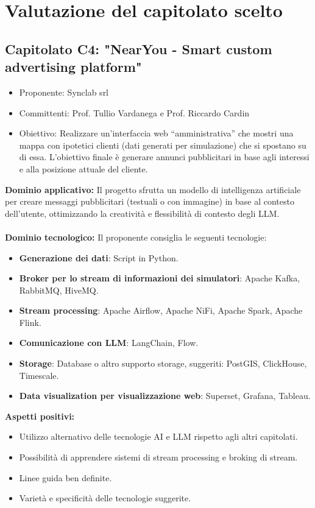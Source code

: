 \documentclass[10pt]{article}
\begin{document}
\section{Valutazione del capitolato scelto}
\subsection{Capitolato C4: "NearYou - Smart custom advertising platform"}
\begin{itemize}
    \item Proponente: Synclab srl
    \item Committenti: Prof. Tullio Vardanega e Prof. Riccardo Cardin
    \item Obiettivo: Realizzare un'interfaccia web “amministrativa” che mostri una mappa con ipotetici clienti (dati generati per simulazione) che si spostano su di essa. L’obiettivo finale è generare annunci pubblicitari in base agli interessi e alla posizione attuale del cliente.
\end{itemize}
\textbf{Dominio applicativo:}
Il progetto sfrutta un modello di intelligenza artificiale per creare messaggi pubblicitari (testuali o con immagine) in base al contesto dell’utente, ottimizzando la creatività e flessibilità di contesto degli LLM.\\
\\
\textbf{Dominio tecnologico:}  
Il proponente consiglia le seguenti tecnologie:
\begin{itemize}
    \item \textbf{Generazione dei dati}: Script in Python.
    \item \textbf{Broker per lo stream di informazioni dei simulatori}: Apache Kafka, RabbitMQ, HiveMQ.
    \item \textbf{Stream processing}: Apache Airflow, Apache NiFi, Apache Spark, Apache Flink.
    \item \textbf{Comunicazione con LLM}: LangChain, Flow.
    \item \textbf{Storage}: Database o altro supporto storage, suggeriti: PostGIS, ClickHouse, Timescale.
    \item \textbf{Data visualization per visualizzazione web}: Superset, Grafana, Tableau.
\end{itemize}
\textbf{Aspetti positivi:}
\begin{itemize}
    \item Utilizzo alternativo delle tecnologie AI e LLM rispetto agli altri capitolati.
    \item Possibilità di apprendere sistemi di stream processing e broking di stream.
    \item Linee guida ben definite.
    \item Varietà e specificità delle tecnologie suggerite.
\end{itemize}
\end{document}
